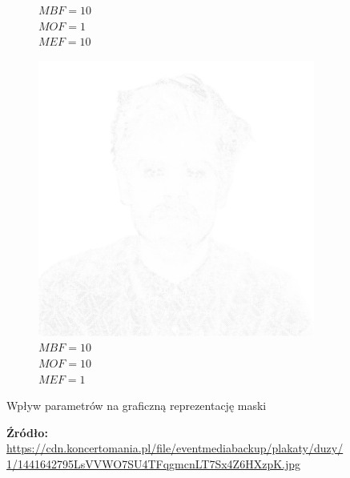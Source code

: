 \documentclass[a4paper, 12pt, polish, twoside]{extreport}
\begin{document}
\begin{figure}[H]
\begin{subfigure}{0.32\textwidth}
        \caption{\(MBF = 10\) \\ \(MOF = 1\) \\ \(MEF = 10\)}
        \label{mine-param-taco-h}
    \end{subfigure}
    \begin{subfigure}{0.32\textwidth}
        \centering
        \includegraphics[width = \textwidth]{img/4-mine/taco-mask/taco_mask_c20_inv0_bg10_obj10_ed1.png}
        \caption{\(MBF = 10\) \\ \(MOF = 10\) \\ \(MEF = 1\)}
        \label{mine-param-taco-i}
    \end{subfigure}
    \caption{Wpływ parametrów na graficzną reprezentację maski}
    \caption*{\footnotesize{\textbf{Źródło:} {\url{https://cdn.koncertomania.pl/file/eventmediabackup/plakaty/duzy/1/1441642795LsVVWO7SU4TFqgmcnLT7Sx4Z6HXzpK.jpg}}}}
    \label{mine-param-taco}
    \end{figure}
    
\end{document}
